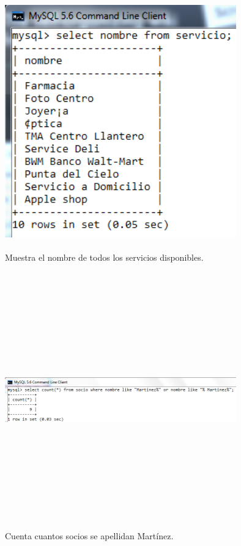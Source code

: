 \documentclass[12pt, titlepage]{article}
\begin{document}
\begin{figure}[H]
    \begin{center}
        \includegraphics[width=10cm, height=11cm]{img/servicios.png}
        \caption{Muestra el nombre de todos los servicios disponibles.}
        \label{fig:arlter8}
    \end{center}
\end{figure}
\begin{figure}[H]
    \begin{center}
        \includegraphics[width=10cm, height=11cm]{img/martinez.png}
        \caption{Cuenta cuantos socios se apellidan Martínez.}
        \label{fig:arlter9}
    \end{center}
\end{figure}
\end{document}
